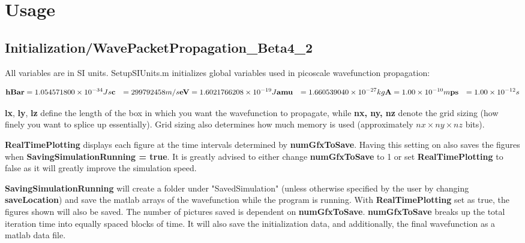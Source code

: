 \documentclass[11pt,letterpaper]{article}
\renewcommand{\\}{\bigskip}
\begin{document}
\section{Usage}

\subsection{Initialization/WavePacketPropagation\_Beta4\_2} 

All variables are in SI units. SetupSIUnits.m initializes global variables used in picoscale wavefunction propagation:

\begin{align*}
    \textbf{hBar} &= 1.054571800 \times 10^{-34} Js\\
    \textbf{c} &= 299792458 m/s\\
    \textbf{eV} &= 1.6021766208 \times 10^{-19} J\\
    \textbf{amu} &=  1.660539040 \times 10^{-27} kg\\
    \textbf{A} &= 1.00 \times 10^{-10} m\\
    \textbf{ps} &= 1.00 \times 10^{-12} s
\end{align*}

\textbf{lx}, \textbf{ly}, \textbf{lz} define the length of the box in which you want the wavefunction to propagate, while \textbf{nx, ny, nz} denote the grid sizing (how finely you want to splice up essentially). Grid sizing also determines how much memory is used (approximately $nx \times ny \times nz$ bits).\\

\textbf{RealTimePlotting} displays each figure at the time intervals determined by \textbf{numGfxToSave}. Having this setting on also saves the figures when \textbf{SavingSimulationRunning = true}. It is greatly advised to either change \textbf{numGfxToSave} to 1 or set \textbf{RealTimePlotting} to false as it will greatly improve the simulation speed.\\

\textbf{SavingSimulationRunning} will create a folder under "SavedSimulation" (unless otherwise specified by the user by changing \textbf{saveLocation}) and save the matlab arrays of the wavefunction while the program is running. With \textbf{RealTimePlotting} set as true, the figures shown will also be saved. The number of pictures saved is dependent on \textbf{numGfxToSave}. \textbf{numGfxToSave} breaks up the total iteration time into equally spaced blocks of time. It will also save the initialization data, and additionally, the final wavefunction as a matlab data file.\\
\end{document}
